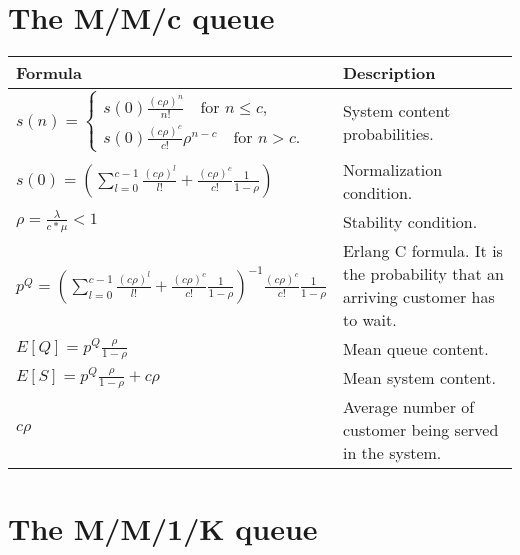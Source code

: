 \documentclass{article}
\begin{document}
\section{The M/M/c queue}
\renewcommand{\arraystretch}{3} %
\begin{longtable}{| p{9cm} | p{6cm} |}
    \hline
    \textbf{Formula} & \textbf{Description}  \\ \hline
    \endhead
    \hline
    \endfoot
    $ s(n) = {\begin{cases}{s(0)\frac {(c \rho)^n}{n!}}\quad {\text{for }} n\le c ,\\[8pt] s(0) \frac{(c\rho)^c}{c!}\rho^{n-c} \quad{\text{for }} n>c.\end{cases}} $ & System content probabilities. \\
    \hline
    $ s(0) = (\sum_{l=0}^{c-1}\frac{(c\rho)^l}{l!} + \frac{(c\rho)^c}{c!}\frac{1}{1- \rho}) $ & Normalization condition.\\
    \hline
    $ \rho = \frac{\lambda}{c*\mu} < 1 $ & Stability condition. \\
    \hline
    $ p^Q  = (\sum_{l=0}^{c-1}\frac{(c\rho)^l}{l!} + \frac{(c\rho)^c}{c!}\frac{1}{1- \rho})^{-1} \frac{(c\rho)^c}{c!}\frac{1}{1 - \rho} $ & Erlang C formula. It is the probability that an arriving customer has to wait. \\
    \hline
    $ E[Q] = p^Q \frac{\rho}{1 - \rho} $ & Mean queue content. \\
    \hline
    $ E[S] = p^Q \frac{\rho}{1 - \rho} + c\rho $ & Mean system content. \\
    \hline
    $ c\rho $ & Average number of customer being served in the system. \\
    \hline
\end{longtable}

\section{The M/M/1/K queue}
\end{document}
